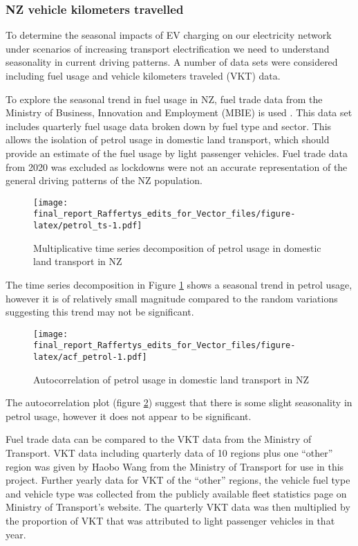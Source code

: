 \documentclass[
]{article}
\begin{document}
\hypertarget{nz-vehicle-kilometers-travelled}{%
\subsubsection{NZ vehicle kilometers
travelled}\label{nz-vehicle-kilometers-travelled}}

To determine the seasonal impacts of EV charging on our electricity
network under scenarios of increasing transport electrification we need
to understand seasonality in current driving patterns. A number of data
sets were considered including fuel usage and vehicle kilometers
traveled (VKT) data.

To explore the seasonal trend in fuel usage in NZ, fuel trade data from
the Ministry of Business, Innovation and Employment (MBIE) is used
\cite{fuel_trade}. This data set includes quarterly fuel usage data
broken down by fuel type and sector. This allows the isolation of petrol
usage in domestic land transport, which should provide an estimate of
the fuel usage by light passenger vehicles. Fuel trade data from 2020
was excluded as lockdowns were not an accurate representation of the
general driving patterns of the NZ population.

\begin{figure}
\centering
\texttt{[image: final\_report\_Raffertys\_edits\_for\_Vector\_files/figure-latex/petrol\_ts-1.pdf]}
\caption{Multiplicative time series decomposition of petrol usage in
domestic land transport in NZ\label{fig:petrol_ts}}
\end{figure}

The time series decomposition in Figure \ref{fig:petrol_ts} shows a
seasonal trend in petrol usage, however it is of relatively small
magnitude compared to the random variations suggesting this trend may
not be significant.

\begin{figure}
\centering
\texttt{[image: final\_report\_Raffertys\_edits\_for\_Vector\_files/figure-latex/acf\_petrol-1.pdf]}
\caption{Autocorrelation of petrol usage in domestic land transport in
NZ\label{fig:acf_petrol}}
\end{figure}

The autocorrelation plot (figure \ref{fig:acf_petrol}) suggest that
there is some slight seasonality in petrol usage, however it does not
appear to be significant.

Fuel trade data can be compared to the VKT data from the Ministry of
Transport. VKT data including quarterly data of 10 regions plus one
``other'' region was given by Haobo Wang from the Ministry of Transport
for use in this project. Further yearly data for VKT of the ``other''
regions, the vehicle fuel type and vehicle type was collected from the
publicly available fleet statistics page on Ministry of Transport's
website. The quarterly VKT data was then multiplied by the proportion of
VKT that was attributed to light passenger vehicles in that year.
\end{document}
